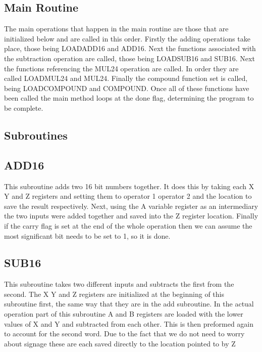 \documentclass[12pt,letterpaper]{article}
\begin{document}
\subsection{Main Routine}
The main operations that happen in the main routine are those that are initialized below and are called in this order. Firstly the adding operations take place, those being LOADADD16 and ADD16. Next the functions associated with the subtraction operation are called, those being LOADSUB16 and SUB16. Next the functions referencing the MUL24 operation are called. In order they are called LOADMUL24 and MUL24. Finally the compound function set is called, being LOADCOMPOUND and COMPOUND. Once all of these functions have been called the main method loops at the done flag, determining the program to be complete.


\subsection{Subroutines}
	\subsection{ADD16}
	This subroutine adds two 16 bit numbers together. It does this by taking each X Y and Z registers and setting them to operator 1 operator 2 and the location to save the result respectively. Next, using the A variable register as an intermediary the two inputs were added together and saved into the Z register location. Finally if the carry flag is set at the end of the whole operation then we can assume the most significant bit needs to be set to 1, so it is done. 
	
	\subsection{SUB16}
  	This subroutine takes two different inputs and subtracts the first from the second. The X Y and Z registers are initialized at the beginning of this subroutine first, the same way that they are in the add subroutine. In the actual operation part of this subroutine A and B registers are loaded with the lower values of X and Y and subtracted from each other. This is then preformed again to account for the second word. Due to the fact that we do not need to worry about signage these are each saved directly to the location pointed to by Z 
\end{document}
